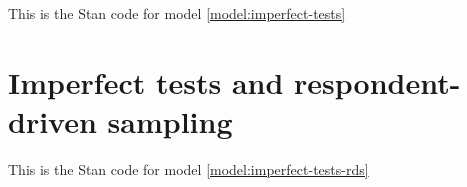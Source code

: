 This is the Stan code for model \eqref{model:imperfect-tests}



\section{Imperfect tests and respondent-driven sampling}

This is the Stan code for model \eqref{model:imperfect-tests-rds}





